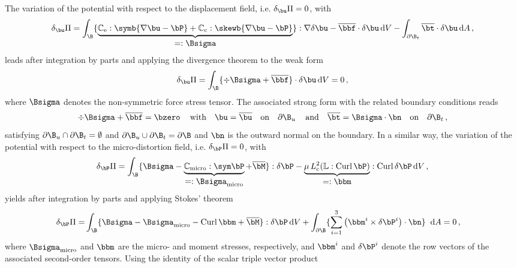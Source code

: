 The variation of the potential with respect to the displacement field, i.e. $\delta_{\bu} \Pi = 0$, with 
\begin{equation}
\delta_{\bu} \Pi =  \int_{\B} \{ \underbrace{\Ce : \symb{ \nabla \bu - \Bdis}+  \Cc : \skewb{ \nabla \bu - \Bdis}}_{ \textstyle =:\Bsigma} \} :  {\nabla \delta \bu} - \overline\bbf \cdot \delta \bu  \, \textrm{d}V - \int_{\partial \B_t} \overline\bt \cdot \delta \bu  \, \textrm{d}A\,,
\end{equation} 
leads after integration by parts and applying the divergence theorem to the weak form 
 \begin{equation}
\delta_{\bu} \Pi =  \int_{\B}   \{ \div \Bsigma + \overline\bbf \} \cdot \delta \bu \, \textrm{d}V  = 0 \, ,
\end{equation}  
where  $\Bsigma$ denotes the non-symmetric force stress tensor.
The associated strong form with the related boundary conditions reads 
 \begin{equation}
   \label{eq:sf1}
 \div\Bsigma+\overline\bbf = \bzero \,  \quad \textrm{with} \quad \bu = \overline{\bu} \quad \textrm{on} \quad \partial \B_u\, \quad  \textrm{and} \quad \overline\bt = \Bsigma \cdot \bn \quad \textrm{on} \quad  \partial \B_t \,, 
\end{equation}  
satisfying  $\partial \B_u \cap \partial \B_t = \emptyset $ and  $\partial \B_u \cup \partial \B_t = \partial \B $ and $\bn$ is the outward normal on the boundary. In a similar way, the variation of the potential with respect to the micro-distortion field, i.e. $\delta_{\Bdis} \Pi = 0$, with 
\begin{equation}
\label{eq:de1}
 \delta_{\Bdis} \Pi =   \int_{\B} \{ \Bsigma  - \underbrace{\Cmicro : \sym \Bdis}_{\textstyle =:\Bsigma_\textrm{micro} } + \overline\bM\} :  \delta {\Bdis}  -  \underbrace{\mu \, \Lc^2  (\IL : \Curl \Bdis)}_{\textstyle =:\bbm} : \Curl \delta {\Bdis} \, \textrm{d} V\,, 
\end{equation}
yields after integration by parts and applying Stokes' theorem  
\begin{equation}
\begin{aligned}
 \delta_{\Bdis} \Pi = &  \int_{\B}  \{ \Bsigma - \Bsigma_\textrm{micro}  - \Curl \bbm + \overline\bM\} :  \delta {\Bdis} \, \textrm{d} V +  \int_{ \partial \B}  \{ \sum_{i=1}^3  \left( \bbm^i  \times \delta {\Bdis}^i  \right) \cdot \bn  \}  \;\; \textrm{d}A  
 = 0\,, 
\end{aligned} 
\end{equation}
where $\Bsigma_\textrm{micro}  $ and $\bbm$ are  the micro- and moment stresses, respectively, and $\bbm^i$ and $\delta \Bdis^i$ denote the row vectors of the associated second-order tensors. Using the identity of the scalar triple vector product
